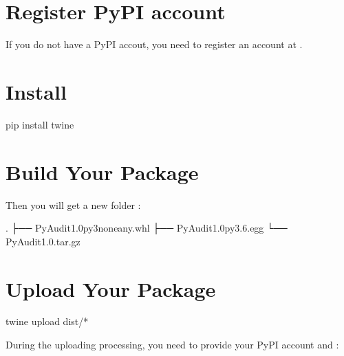 \documentclass[letterpaper,12pt,english]{sphinxmanual}
\begin{document}
\section{Register PyPI account}
\label{\detokenize{pypi:register-pypi-account}}
If you do not have a PyPI accout, you need to register an account at  .


\section{Install }
\label{\detokenize{pypi:install-twine}}
\begin{sphinxVerbatim}[commandchars=\\\{\}]
pip install twine
\end{sphinxVerbatim}


\section{Build Your Package}
\label{\detokenize{pypi:build-your-package}}
\begin{sphinxVerbatim}[commandchars=\\\{\}]
   
\end{sphinxVerbatim}

Then you will get a new folder :

\begin{sphinxVerbatim}[commandchars=\\\{\}]
.
├── PyAudit\PYGZhy{}1.0\PYGZhy{}py3\PYGZhy{}none\PYGZhy{}any.whl
├── PyAudit\PYGZhy{}1.0\PYGZhy{}py3.6.egg
└── PyAudit\PYGZhy{}1.0.tar.gz
\end{sphinxVerbatim}


\section{Upload Your Package}
\label{\detokenize{pypi:upload-your-package}}
\begin{sphinxVerbatim}[commandchars=\\\{\}]
twine upload dist/*
\end{sphinxVerbatim}

During the uploading processing, you need to provide your PyPI account  and :
\end{document}
